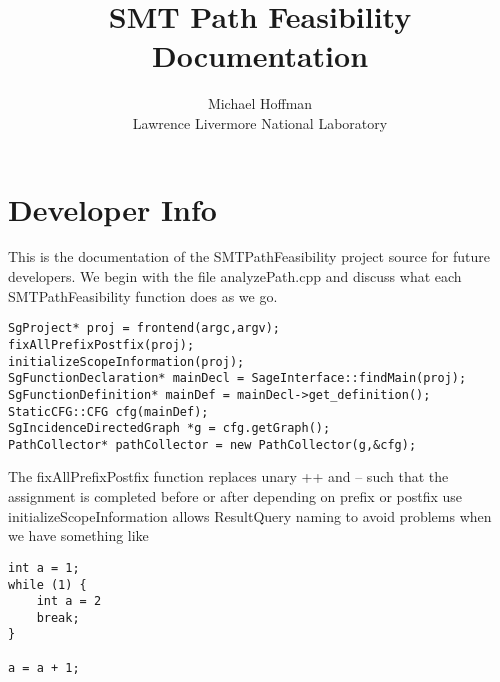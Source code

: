 \documentclass[11pt]{article}
\begin{document}
\lstset{language=C++}
\title{SMT Path Feasibility Documentation}
\author{Michael Hoffman\\
Lawrence Livermore National Laboratory}
\maketitle



\section{Developer Info}


This is the documentation of the SMTPathFeasibility project source for future developers. We begin with the file analyzePath.cpp and discuss what each SMTPathFeasibility function does as we go.\\

\begin{lstlisting}
SgProject* proj = frontend(argc,argv);
fixAllPrefixPostfix(proj);
initializeScopeInformation(proj);
SgFunctionDeclaration* mainDecl = SageInterface::findMain(proj);
SgFunctionDefinition* mainDef = mainDecl->get_definition();
StaticCFG::CFG cfg(mainDef);
SgIncidenceDirectedGraph *g = cfg.getGraph();
PathCollector* pathCollector = new PathCollector(g,&cfg);
\end{lstlisting}
The fixAllPrefixPostfix function replaces unary ++ and -- such that the assignment is completed before or after depending on prefix or postfix use\\
initializeScopeInformation allows ResultQuery naming to avoid problems when
we have something like

\begin{lstlisting}
int a = 1;
while (1) {
	int a = 2
	break;
}

a = a + 1;
\end{lstlisting}
\end{document}

